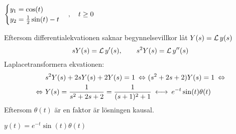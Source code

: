 \begin{task}{5.4}
	\ans 
	$\begin{cases}
	y_1=\cos(t) \\
	y_2=\frac{1}{2}\sin(t)-t
	\end{cases}, \quad t \ge 0$
\end{task}

\begin{task}{5.5}
	Eftersom differentialekvationen saknar begynnelsevillkor låt $Y(s)=\operatorname{\mathcal{L}} y(s)$ 
	\[sY(s)=\operatorname{\mathcal{L}} y'(s),\qquad s^2Y(s)=\operatorname{\mathcal{L}} y''(s)\]
	Laplacetransformera ekvationen:
	\begin{align*}
	&s^2Y(s)+2sY(s)+2Y(s)=1 \lra
	(s^2+2s+2)Y(s)=1\lra \\ \lra
	&Y(s)=\frac{1}{s^2+2s+2}=
	\frac{1}{(s+1)^2+1}\llra
	e^{-t}\sin(t)\theta(t)
	\end{align*}
	Eftersom $\theta(t)$ är en faktor är lösningen kausal.
	
	\ans $y(t)=e^{-t}\sin(t)\theta(t)$
\end{task}

